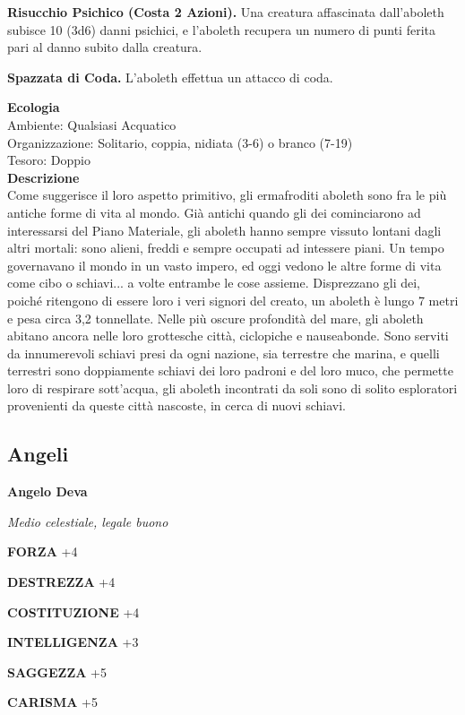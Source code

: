 \begin{multicols}{2}
\textbf{Risucchio Psichico (Costa 2 Azioni).} Una creatura affascinata dall'aboleth subisce 10 (3d6) danni psichici, e l'aboleth recupera un numero di punti ferita pari al danno subito dalla creatura.

\textbf{Spazzata di Coda.} L'aboleth effettua un attacco di coda.

\textbf{Ecologia}\\
Ambiente: Qualsiasi Acquatico\\
Organizzazione: Solitario, coppia, nidiata (3-6) o branco (7-19)\\
Tesoro: Doppio\\
\textbf{Descrizione}\\
Come suggerisce il loro aspetto primitivo, gli ermafroditi aboleth sono fra le più antiche forme di vita al mondo. Già antichi quando gli dei cominciarono ad interessarsi del Piano Materiale, gli aboleth hanno sempre vissuto lontani dagli altri mortali: sono alieni, freddi e sempre occupati ad intessere piani. Un tempo governavano il mondo in un vasto impero, ed oggi vedono le altre forme di vita come cibo o schiavi... a volte entrambe le cose assieme. Disprezzano gli dei, poiché ritengono di essere loro i veri signori del creato, un aboleth è lungo 7 metri e pesa circa 3,2 tonnellate. Nelle più oscure profondità del mare, gli aboleth abitano ancora nelle loro grottesche città, ciclopiche e nauseabonde. Sono serviti da innumerevoli schiavi presi da ogni nazione, sia terrestre che marina, e quelli terrestri sono doppiamente schiavi dei loro padroni e del loro muco, che permette loro di respirare sott'acqua, gli aboleth incontrati da soli sono di solito esploratori provenienti da queste città nascoste, in cerca di nuovi schiavi.\\



\subsection{Angeli}

\medskip{}\textbf{Angelo Deva}

\emph{Medio celestiale, legale buono}

\textbf{FORZA} +4

\textbf{DESTREZZA} +4

\textbf{COSTITUZIONE} +4

\textbf{INTELLIGENZA} +3

\textbf{SAGGEZZA} +5

\textbf{CARISMA} +5


\end{multicols}
